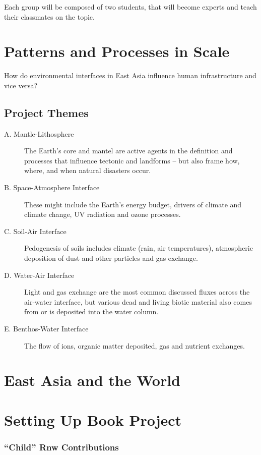 Each group will be composed of two students, that will become experts and teach their classmates on the topic. 


\section{Patterns and Processes in Scale}

How do environmental interfaces in East Asia influence human infrastructure and vice versa?

\subsection{Project Themes}

\begin{description}
	\item[A. Mantle-Lithosphere] The Earth's core and mantel are active agents in the definition and processes that influence tectonic and landforms -- but also frame how, where, and when natural disasters occur. 
	\item[B. Space-Atmosphere Interface] These might include the Earth's energy budget, drivers of climate and climate change, UV radiation and ozone processes.
	\item[C. Soil-Air Interface] Pedogenesis of soils includes climate (rain, air temperatures), atmospheric deposition of dust and other particles and gas exchange. 
	\item[D. Water-Air Interface] Light and gas exchange are the most common discussed fluxes across the air-water interface, but various dead and living biotic material also comes from or is deposited into the water column.
	\item[E. Benthos-Water Interface] The flow of ions, organic matter deposited, gas and nutrient exchanges.
\end{description}

\section{East Asia and the World}


\section{Setting Up Book Project}

\subsubsection{``Child'' Rnw Contributions}

